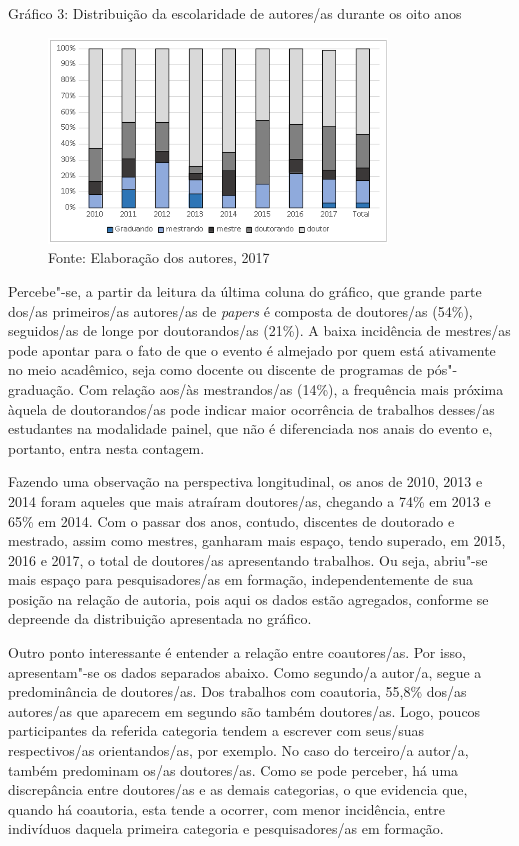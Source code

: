 Gráfico 3: Distribuição da escolaridade de autores/as durante os oito anos

\begin{figure}[!ht]
\centering
 \includegraphics[width=90mm]{./imgs/graf3_3.png}
\caption{Fonte: Elaboração dos autores, 2017}
\end{figure}

Percebe"-se, a partir da leitura da última coluna do gráfico, que grande
parte dos/as primeiros/as autores/as de \emph{papers} é composta de
doutores/as (54\%), seguidos/as de longe por doutorandos/as (21\%). A
baixa incidência de mestres/as pode apontar para o fato de que o evento
é almejado por quem está ativamente no meio acadêmico, seja como docente
ou discente de programas de pós"-graduação. Com relação aos/às
mestrandos/as (14\%), a frequência mais próxima àquela de doutorandos/as
pode indicar maior ocorrência de trabalhos desses/as estudantes na
modalidade painel, que não é diferenciada nos anais do evento e,
portanto, entra nesta contagem.

Fazendo uma observação na perspectiva longitudinal, os anos de 2010,
2013 e 2014 foram aqueles que mais atraíram doutores/as, chegando a 74\%
em 2013 e 65\% em 2014. Com o passar dos anos, contudo, discentes de
doutorado e mestrado, assim como mestres, ganharam mais espaço, tendo
superado, em 2015, 2016 e 2017, o total de doutores/as apresentando
trabalhos. Ou seja, abriu"-se mais espaço para pesquisadores/as em
formação, independentemente de sua posição na relação de autoria, pois
aqui os dados estão agregados, conforme se depreende da distribuição
apresentada no gráfico.

Outro ponto interessante é entender a relação entre coautores/as. Por
isso, apresentam"-se os dados separados abaixo. Como segundo/a autor/a,
segue a predominância de doutores/as. Dos trabalhos com coautoria,
55,8\% dos/as autores/as que aparecem em segundo são também doutores/as.
Logo, poucos participantes da referida categoria tendem a escrever com
seus/suas respectivos/as orientandos/as, por exemplo. No caso do
terceiro/a autor/a, também predominam os/as doutores/as. Como se pode
perceber, há uma discrepância entre doutores/as e as demais categorias,
o que evidencia que, quando há coautoria, esta tende a ocorrer, com
menor incidência, entre indivíduos daquela primeira categoria e
pesquisadores/as em formação.

